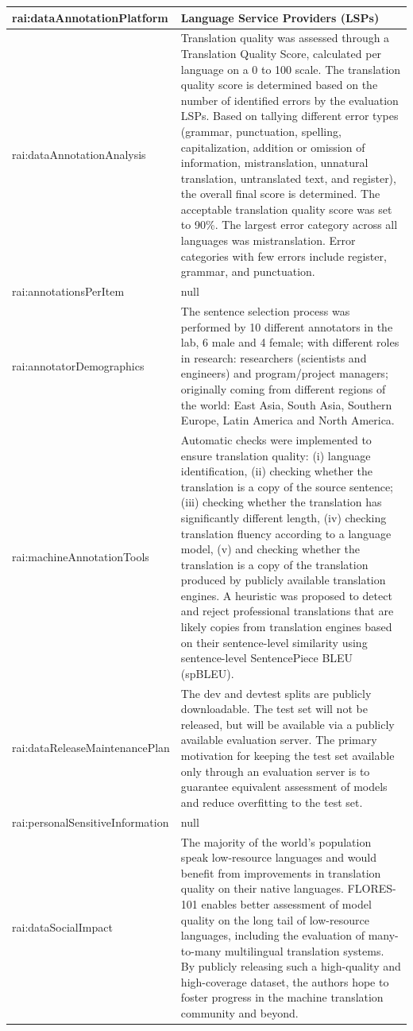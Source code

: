 \documentclass[10pt,a4paper]{article}
\begin{document}
\begin{longtable}{|p{4cm}|p{12cm}|}
\hline
rai:dataAnnotationPlatform & Language Service Providers (LSPs) \\
\hline
rai:dataAnnotationAnalysis & Translation quality was assessed through a Translation Quality Score, calculated per language on a 0 to 100 scale. The translation quality score is determined based on the number of identified errors by the evaluation LSPs. Based on tallying different error types (grammar, punctuation, spelling, capitalization, addition or omission of information, mistranslation, unnatural translation, untranslated text, and register), the overall final score is determined. The acceptable translation quality score was set to 90\%. The largest error category across all languages was mistranslation. Error categories with few errors include register, grammar, and punctuation. \\
\hline
rai:annotationsPerItem & null \\
\hline
rai:annotatorDemographics & The sentence selection process was performed by 10 different annotators in the lab, 6 male and 4 female; with different roles in research: researchers (scientists and engineers) and program/project managers; originally coming from different regions of the world: East Asia, South Asia, Southern Europe, Latin America and North America. \\
\hline
rai:machineAnnotationTools & Automatic checks were implemented to ensure translation quality: (i) language identification, (ii) checking whether the translation is a copy of the source sentence; (iii) checking whether the translation has significantly different length, (iv) checking translation fluency according to a language model, (v) and checking whether the translation is a copy of the translation produced by publicly available translation engines. A heuristic was proposed to detect and reject professional translations that are likely copies from translation engines based on their sentence-level similarity using sentence-level SentencePiece BLEU (spBLEU). \\
\hline
rai:dataReleaseMaintenancePlan & The dev and devtest splits are publicly downloadable. The test set will not be released, but will be available via a publicly available evaluation server. The primary motivation for keeping the test set available only through an evaluation server is to guarantee equivalent assessment of models and reduce overfitting to the test set. \\
\hline
rai:personalSensitiveInformation & null \\
\hline
rai:dataSocialImpact & The majority of the world's population speak low-resource languages and would benefit from improvements in translation quality on their native languages. FLORES-101 enables better assessment of model quality on the long tail of low-resource languages, including the evaluation of many-to-many multilingual translation systems. By publicly releasing such a high-quality and high-coverage dataset, the authors hope to foster progress in the machine translation community and beyond. \\

\end{longtable}
\end{document}
